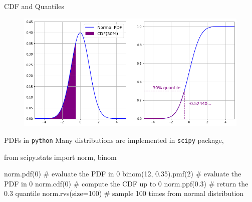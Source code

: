 \documentclass{beamer}
\begin{document}
\begin{frame}{CDF and Quantiles}
    \begin{figure}[h]
    \begin{center}
    \includegraphics[width=0.7\linewidth]{cdf_quantiles}
    \end{center}
    \end{figure}    
\end{frame}

\begin{frame}[fragile]{PDFs in \texttt{python}}
    Many distributions are implemented in \texttt{scipy} package,
\begin{ipython}
from scipy.stats import norm, binom
     
norm.pdf(0)                 # evaluate the PDF in 0
binom(12, 0.35).pmf(2)      # evaluate the PDF in 0
norm.cdf(0)                 # compute the CDF up to 0
norm.ppf(0.3)               # return the 0.3 quantile
norm.rvs(size=100)          # sample 100 times from normal distribution
\end{ipython}
\end{frame}
\end{document}
